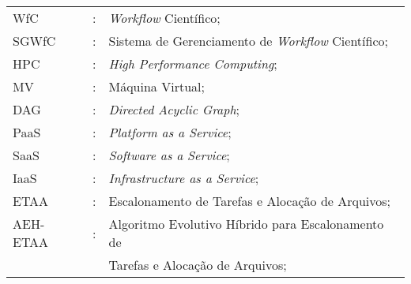 \cleardoublepage
{}
\begin{tabular}{lcl}
WfC & : & \textit{Workflow} Científico;\\
SGWfC & : & Sistema de Gerenciamento de \textit{Workflow} Científico;\\
HPC & : & \textit{High Performance Computing};\\
MV & : & Máquina Virtual;\\
DAG& : & \textit{Directed Acyclic Graph};\\
PaaS & : &\textit{Platform as a Service};\\
SaaS & : & \textit{Software as a Service};\\
IaaS & : & \textit{Infrastructure as a Service};\\
ETAA & : & Escalonamento de Tarefas e Alocação de Arquivos;\\
AEH-ETAA & : & Algoritmo Evolutivo Híbrido para Escalonamento de\\ 
            && Tarefas e Alocação de Arquivos;
        
\end{tabular}
\pagestyle{ruledheader}
\tableofcontents


